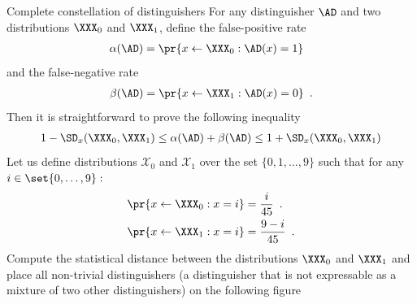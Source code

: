 \documentclass{crypto-exercise}
\author{Sven Laur}
\begin{document}
\begin{exercise}{Complete constellation of distinguishers}
For any distinguisher $\AD$ and two distributions $\XXX_0$ and $\XXX_1$, define the false-positive rate
\begin{align*}
\alpha(\AD)=\pr{x\gets\XXX_0: \AD(x)=1}\enspace\phantom{.}
\end{align*}
and the false‑negative rate 
\begin{align*}
\beta(\AD)=\pr{x\gets\XXX_1: \AD(x)=0}\enspace.
\end{align*}
Then it is straightforward to prove the following inequality 
\begin{align}\label{ineq}
1-\SD_x(\XXX_0,\XXX_1)\leq \alpha(\AD) +\beta(\AD)\leq 1+\SD_x(\XXX_0,\XXX_1)
\end{align}
Let us define distributions $\mathcal{X}_0$ and $\mathcal{X}_1$ over the set $\{0,1,\ldots, 9\}$ such that  for any $i\in\set{0,\ldots, 9}:$
\begin{align*}
\pr{x\gets \XXX_0: x=i}&=\frac{i}{45}\enspace.\\
\pr{x\gets \XXX_1: x=i}&=\frac{9-i}{45}\enspace.
\end{align*}
Compute the statistical distance between the distributions $\XXX_0$ and $\XXX_1$ and place all non-trivial distinguishers (a distinguisher that is not expressable as a mixture of two other distinguishers) on the following figure  
\begin{center}
\end{center}



\end{exercise}


\begin{solution}
\end{solution}
\end{document}

